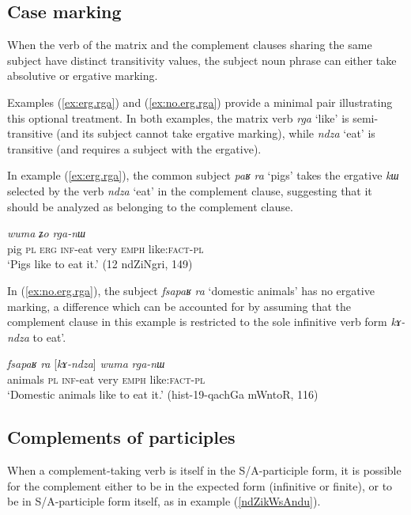 \documentclass[oneside,a4paper,11pt]{article}
\newcommand{\ipa}[1]{\textit{\phon#1}}
\newcommand{\jpg}[2]{\ipa{#1} `#2'}
\begin{document}
\subsection{Case marking}
When the verb of the matrix and the complement clauses sharing the same subject have distinct transitivity values, the subject noun phrase can either take absolutive or ergative marking. 

Examples (\ref{ex:erg.rga}) and (\ref{ex:no.erg.rga}) provide a minimal pair illustrating this optional treatment. In both examples, the matrix verb \jpg{rga}{like} is semi-transitive (and its subject cannot take ergative marking), while \jpg{ndza}{eat} is transitive (and requires a subject with the ergative).

In example (\ref{ex:erg.rga}), the common subject \ipa{paʁ} \ipa{ra}  `pigs' takes the ergative \ipa{kɯ} selected by the verb  \jpg{ndza}{eat} in the complement clause, suggesting that it should be analyzed as belonging to the complement clause.

\begin{exe}
\ex \label{ex:erg.rga}
\gll
[\ipa{paʁ}  	\ipa{ra}  	\ipa{kɯ}  	\ipa{kɤ-ndza}]  	\ipa{wuma}  	\ipa{ʑo}  	\ipa{rga-nɯ}  \\
pig \textsc{pl} \textsc{erg} \textsc{inf}-eat very \textsc{emph}  like:\textsc{fact}-\textsc{pl} \\
 \glt `Pigs like to eat it.' (12 ndZiNgri, 149)
\end{exe}

In (\ref{ex:no.erg.rga}), the subject \ipa{fsapaʁ} 	\ipa{ra} `domestic animals' has no ergative marking, a difference which can be accounted for by assuming that the  complement clause in this example is restricted to the sole infinitive verb form \ipa{kɤ-ndza}   to eat'.

\begin{exe}
\ex \label{ex:no.erg.rga}
\gll \ipa{fsapaʁ} 	\ipa{ra} 	[\ipa{kɤ-ndza}] 	\ipa{wuma} 	\ipa{rga-nɯ}  \\
animals \textsc{pl}  \textsc{inf}-eat very \textsc{emph}  like:\textsc{fact}-\textsc{pl} \\
\glt `Domestic animals like to eat it.' (hist-19-qachGa mWntoR, 116)
\end{exe}
 



\subsection{Complements of participles}
When a complement-taking verb is itself in the S/A-participle form, it is possible for the complement either to be in the expected form (infinitive or finite), or to be in S/A-participle form itself, as in example (\ref{ndZikWsAndu}).
\end{document}
